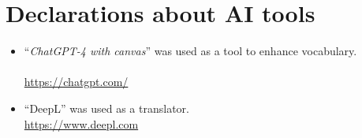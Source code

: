 \documentclass{article}
\newcounter{myequation}
\begin{document}
\newpage
\setlength{\bibitemsep}{1.2\baselineskip}

\listoftables

\listoffigures

\listofmyequations

\section*{Declarations about AI tools}
\begin{itemize}
    \item ``\textit{ChatGPT-4 with canvas}'' was used as a tool to enhance vocabulary.\\
        {}\\
        \url{https://chatgpt.com/}
    \item ``DeepL'' was used as a translator.\\
        \url{https://www.deepl.com}
\end{itemize}

\printbibliography
\end{document}
